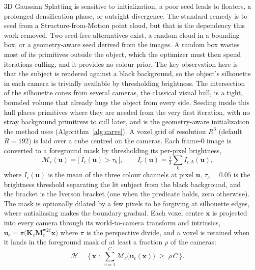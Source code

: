 3D Gaussian Splatting is sensitive to
initialization, a poor seed leads to floaters, a prolonged densification phase, or
outright divergence. The standard remedy is to seed from a Structure-from-Motion
point cloud, but that is the dependency this work removed. Two seed-free
alternatives exist, a random cloud in a bounding box, or a geometry-aware seed derived
from the images. A random box wastes most of its primitives outside the object, which
the optimizer must then spend iterations culling, and it provides no colour prior. The
key observation here is that the subject is rendered against a black background, so the
object's silhouette in each camera is trivially available by thresholding
brightness. The intersection of the silhouette cones from several cameras, the
classical visual hull, is a tight, bounded volume that already hugs the object
from every side. Seeding inside this hull places primitives where they are needed from
the very first iteration, with no stray background primitives to cull later, and is
the geometry-aware initialization the method uses (Algorithm~\ref{alg:carve}). A voxel grid of resolution $R^3$ (default $R = 192$) is laid over a cube centred on
the cameras. Each frame-$0$ image is converted to a foreground mask by thresholding
its per-pixel brightness,
\begin{equation}
    \mathcal{M}_c(\mathbf{u}) = \big[\,\bar I_c(\mathbf{u}) > \tau_b\,\big],
    \qquad \bar I_c(\mathbf{u}) = \tfrac{1}{3}\textstyle\sum_{k} I_{c,k}(\mathbf{u}),
\end{equation}
where $\bar I_c(\mathbf{u})$ is the mean of the three colour channels at pixel
$\mathbf{u}$, $\tau_b = 0.05$ is the brightness threshold separating the lit subject
from the black background, and the bracket is the Iverson bracket (one when the
predicate holds, zero otherwise). The mask is optionally dilated by a few pixels to
be forgiving at silhouette edges, where antialiasing makes the boundary gradual. Each
voxel centre $\mathbf{x}$ is projected into every camera through its world-to-camera
transform and intrinsics, $\mathbf{u}_c = \pi\!\big(\mathbf{K}_c
\mathbf{M}_c^{\text{w2c}} \mathbf{x}\big)$ where $\pi$ is the perspective divide, and
a voxel is retained when it lands in the foreground mask of at least a fraction $\rho$
of the cameras:
\begin{equation}
    \mathcal{H} = \Big\{\, \mathbf{x} \;:\; \textstyle\sum_{c=1}^{C} \mathcal{M}_c\big(\mathbf{u}_c(\mathbf{x})\big) \;\ge\; \rho\, C \,\Big\}.
    \label{eq:hull}
\end{equation}
